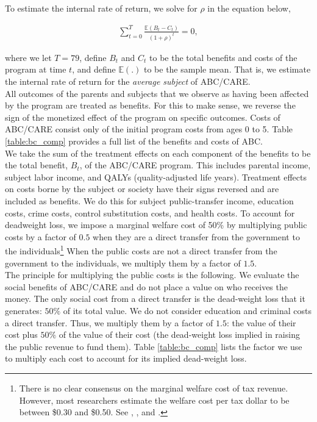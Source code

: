 \noindent To estimate the internal rate of return, we solve for $\rho$ in the equation below,

\begin{align}
\sum_{t=0}^T \frac{ \mathbb{E} (B_t - C_t)}{(1+\rho)^t} = 0,
\end{align}

\noindent where we let $T = 79$, define $B_t$ and $C_t$ to be the total benefits and costs of the program at time $t$, and define $\mathbb{E}(.)$ to be the sample mean. That is, we estimate the internal rate of return for the \textit{average subject} of ABC/CARE. \\

\noindent All outcomes of the parents and subjects that we observe as having been affected by the program are treated as benefits. For this to make sense, we reverse the sign of the monetized effect of the program on specific outcomes. Costs of ABC/CARE consist only of the initial program costs from ages 0 to 5. Table \ref{table:bc_comp} provides a full list of the benefits and costs of ABC. \\

\noindent We take the sum of the treatment effects on each component of the benefits to be the total benefit, $B_t$, of the ABC/CARE program. This includes parental income, subject labor income, and QALYs (quality-adjusted life years). Treatment effects on costs borne by the subject or society have their signs reversed and are included as benefits. We do this for subject public-transfer income, education costs, crime costs, control substitution costs, and health costs. To account for deadweight loss, we impose a marginal welfare cost of 50\% by multiplying public costs by a factor of $0.5$ when they are a direct transfer from the government to the individuals\footnote{There is no clear consensus on the marginal welfare cost of tax revenue. However, most researchers estimate the welfare cost per tax dollar to be between \$0.30 and \$0.50. See \citet{Feldstein_1999_REStat}, \citet{Heckman_Smith_1998_evaluating}, and \citet{Browning_1987_AER}.} When the public costs are not a direct transfer from the government to the individuals, we multiply them by a factor of $1.5$.\\

\noindent The principle for multiplying the public costs is the following. We evaluate the social benefits of ABC/CARE and do not place a value on who receives the money. The only social cost from a direct transfer is the dead-weight loss that it generates: $50\%$ of its total value. We do not consider education and criminal costs a direct transfer. Thus, we multiply them by a factor of $1.5$: the value of their cost plus $50\%$ of the value of their cost (the dead-weight loss implied in raising the public revenue to fund them). Table \ref{table:bc_comp} lists the factor we use to multiply each cost to account for its implied dead-weight loss.\\

